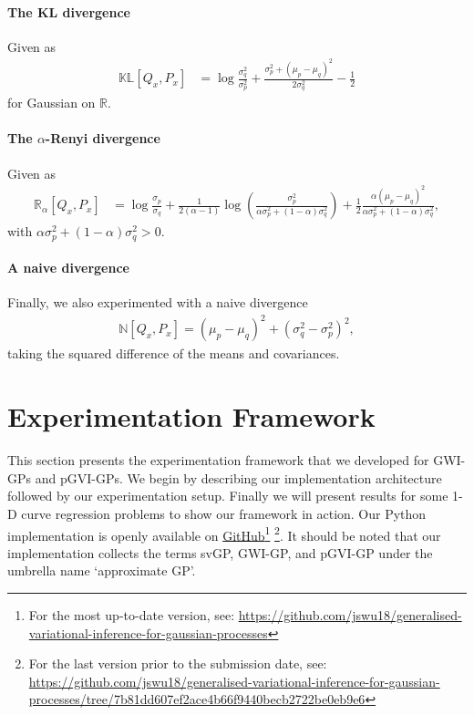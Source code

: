 \documentclass{article}
\numberwithin{equation}{section}
\begin{document}
\paragraph{The KL divergence} Given as
\begin{align}
    \mathbb{KL} \left[Q_{x}, P_{x}\right] &= \log\frac{\sigma_q^2}{\sigma_p^2} + \frac{\sigma_p^2 + \left(\mu_p - \mu_q\right)^2}{2 \sigma_q^2} - \frac{1}{2}
\end{align}
for Gaussian on $\mathbb{R}$.
\paragraph{The $\alpha$-Renyi divergence} Given as
\begin{align}
    \mathbb{R}_\alpha \left[Q_{x}, P_{x}\right] &= \log\frac{\sigma_p}{\sigma_q} + \frac{1}{2(\alpha-1)}\log\left(\frac{\sigma_p^2}{\alpha \sigma_p^2 + (1-\alpha) \sigma_q^2}\right)  + \frac{1}{2}\frac{\alpha \left(\mu_p - \mu_q\right)^2}{\alpha \sigma_p^2 + (1-\alpha) \sigma_q^2},
\end{align}
with $\alpha \sigma_p^2 + (1-\alpha) \sigma_q^2 > 0$.
\paragraph{A naive divergence}Finally, we also experimented with a naive divergence
\begin{align}
    \mathbb{N} \left[Q_{x}, P_{x}\right] = \left(\mu_p - \mu_q\right)^2 + \left(\sigma_q^2-\sigma_p^2\right)^2,
\end{align}
taking the squared difference of the means and covariances.

\newpage
\section{Experimentation Framework}\label{section:experimentation-framework}
This section presents the experimentation framework that we developed for GWI-GPs and pGVI-GPs.
We begin by describing our implementation architecture followed by our experimentation setup.
Finally we will present results for some 1-D curve regression problems to show our framework in action.
Our Python implementation is openly available on \href{https://github.com/jswu18/generalised-variational-inference-for-gaussian-processes}{GitHub}\footnote{For the most up-to-date version, see: \href{https://github.com/jswu18/generalised-variational-inference-for-gaussian-processes}{https://github.com/jswu18/generalised-variational-inference-for-gaussian-processes}} 
\footnote{
For the last version prior to the submission date, see: \href{https://github.com/jswu18/generalised-variational-inference-for-gaussian-processes/tree/7b81dd607ef2ace4b66f9440becb2722be0eb9e6}{https://github.com/jswu18/generalised-variational-inference-for-gaussian-processes/tree/7b81dd607ef2ace4b66f9440becb2722be0eb9e6}}. 
It should be noted that our implementation collects the terms svGP, GWI-GP, and pGVI-GP under the umbrella name `approximate GP'.
\end{document}

